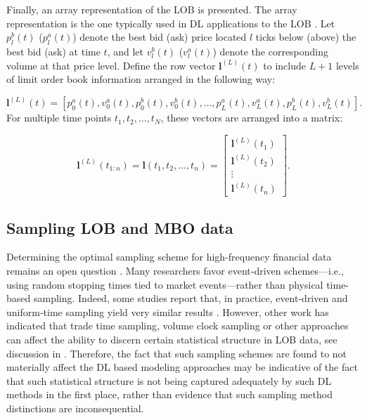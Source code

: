\documentclass{rQUF2e}
\theoremstyle{plain}
\theoremstyle{definition}
\theoremstyle{remark}
\begin{document}
Finally, an array representation of the LOB is presented. The array representation is the one typically used in DL applications to the LOB \citep[see for example][]{kolm2024improving, Zhang_2019}. Let $p_l^b(t)$ ($p_l^a(t)$) denote the best bid (ask) price located $l$ ticks below (above) the best bid (ask) at time $t$, and let $v_l^b(t)$ ($v_l^a(t)$) denote the corresponding volume at that price level. Define the row vector $\mathbf{l}^{(L)}(t)$ to include $L + 1$ levels of limit order book information arranged in the following way:

$$
    \mathbf{l}^{(L)}(t) = [p^a_0(t), v^a_0(t), p^b_0(t), v^b_0(t), \dots, p^a_L(t), v^a_L(t), p^b_L(t), v^b_L(t)].
$$
For multiple time points $t_1, t_2, \dots, t_N$, these vectors are arranged into a matrix:

$$
    \mathbf{l}^{(L)}(t_{1:n})=\mathbf{l}(t_1, t_2, \dots, t_n) = \begin{bmatrix}
        \mathbf{l}^{(L)}(t_1) \\
        \mathbf{l}^{(L)}(t_2) \\
        \vdots                \\
        \mathbf{l}^{(L)}(t_n)
    \end{bmatrix}.
$$

\subsection{Sampling LOB and MBO data}
\label{SubSect:SampLOB}
Determining the optimal sampling scheme for high-frequency financial data remains an open question \citep{dutta2023review}.  Many researchers favor event‐driven schemes—i.e., using random stopping times tied to market events—rather than physical time-based sampling.  Indeed, some studies report that, in practice, event‐driven and uniform‐time sampling yield very similar results \citep{easley2021microstructure}. However, other work has indicated that trade time sampling, volume clock sampling or other approaches can affect the ability to discern certain statistical structure in LOB data, see discussion in \citet{koukorinis4959155memory}. Therefore, the fact that such sampling schemes are found to not materially affect the DL based modeling approaches may be indicative of the fact that such statistical structure is not being captured adequately by such DL methods in the first place, rather than evidence that such sampling method distinctions are inconsequential.
\end{document}
